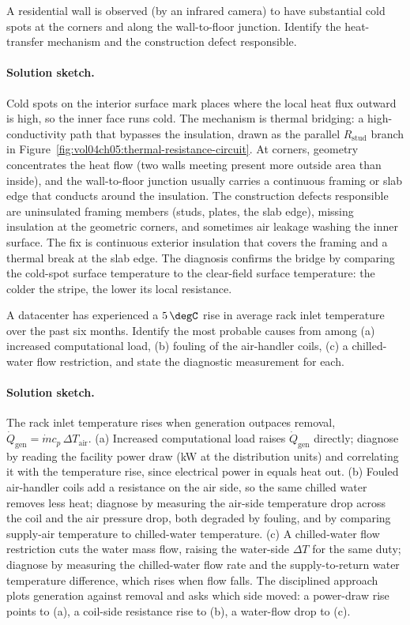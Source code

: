 \begin{exercise}
A residential wall is observed (by an infrared camera) to have
substantial cold spots at the corners and along the wall-to-floor
junction. Identify the heat-transfer mechanism and the construction
defect responsible.
\paragraph{Solution sketch.} Cold spots on the interior surface mark
places where the local heat flux outward is high, so the inner face runs
cold. The mechanism is thermal bridging: a high-conductivity path that
bypasses the insulation, drawn as the parallel $R_{\text{stud}}$ branch
in Figure~\ref{fig:vol04ch05:thermal-resistance-circuit}. At corners,
geometry concentrates the heat flow (two walls meeting present more
outside area than inside), and the wall-to-floor junction usually carries
a continuous framing or slab edge that conducts around the insulation.
The construction defects responsible are uninsulated framing members
(studs, plates, the slab edge), missing insulation at the geometric
corners, and sometimes air leakage washing the inner surface. The fix is
continuous exterior insulation that covers the framing and a thermal
break at the slab edge. The diagnosis confirms the bridge by comparing
the cold-spot surface temperature to the clear-field surface temperature:
the colder the stripe, the lower its local resistance.
\end{exercise}

\begin{exercise}
A datacenter has experienced a $5\,\degC$ rise in average rack inlet
temperature over the past six months. Identify the most probable
causes from among (a) increased computational load, (b) fouling of
the air-handler coils, (c) a chilled-water flow restriction, and
state the diagnostic measurement for each.
\paragraph{Solution sketch.} The rack inlet temperature rises when
generation outpaces removal, $\dot{Q}_{\text{gen}} = \dot{m}c_p\,\Delta
T_{\text{air}}$. (a) Increased computational load raises
$\dot{Q}_{\text{gen}}$ directly; diagnose by reading the facility power
draw (kW at the distribution units) and correlating it with the
temperature rise, since electrical power in equals heat out. (b) Fouled
air-handler coils add a resistance on the air side, so the same chilled
water removes less heat; diagnose by measuring the air-side temperature
drop across the coil and the air pressure drop, both degraded by
fouling, and by comparing supply-air temperature to chilled-water
temperature. (c) A chilled-water flow restriction cuts the water mass
flow, raising the water-side $\Delta T$ for the same duty; diagnose by
measuring the chilled-water flow rate and the supply-to-return water
temperature difference, which rises when flow falls. The disciplined
approach plots generation against removal and asks which side moved: a
power-draw rise points to (a), a coil-side resistance rise to (b), a
water-flow drop to (c).
\end{exercise}

